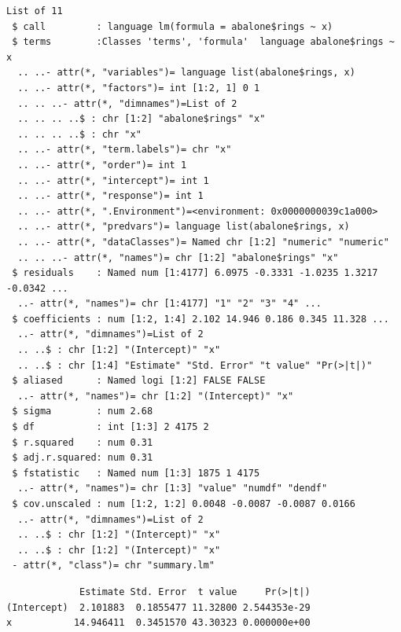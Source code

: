 \documentclass[
  11pt,
]{krantz}
\newenvironment{Shaded}{\begin{snugshade}}{\end{snugshade}}
\newcommand{\CommentTok}[1]{\textcolor[rgb]{0.37,0.37,0.37}{\textit{#1}}}
\newcommand{\ControlFlowTok}[1]{\textcolor[rgb]{0.27,0.27,0.27}{\textbf{#1}}}
\newcommand{\DecValTok}[1]{\textcolor[rgb]{0.06,0.06,0.06}{#1}}
\newcommand{\KeywordTok}[1]{\textcolor[rgb]{0.27,0.27,0.27}{\textbf{#1}}}
\newcommand{\NormalTok}[1]{#1}
\newcommand{\OperatorTok}[1]{\textcolor[rgb]{0.43,0.43,0.43}{\textbf{#1}}}
\newcommand{\StringTok}[1]{\textcolor[rgb]{0.5,0.5,0.5}{#1}}
\begin{document}
\begin{verbatim}
List of 11
 $ call         : language lm(formula = abalone$rings ~ x)
 $ terms        :Classes 'terms', 'formula'  language abalone$rings ~ x
  .. ..- attr(*, "variables")= language list(abalone$rings, x)
  .. ..- attr(*, "factors")= int [1:2, 1] 0 1
  .. .. ..- attr(*, "dimnames")=List of 2
  .. .. .. ..$ : chr [1:2] "abalone$rings" "x"
  .. .. .. ..$ : chr "x"
  .. ..- attr(*, "term.labels")= chr "x"
  .. ..- attr(*, "order")= int 1
  .. ..- attr(*, "intercept")= int 1
  .. ..- attr(*, "response")= int 1
  .. ..- attr(*, ".Environment")=<environment: 0x0000000039c1a000> 
  .. ..- attr(*, "predvars")= language list(abalone$rings, x)
  .. ..- attr(*, "dataClasses")= Named chr [1:2] "numeric" "numeric"
  .. .. ..- attr(*, "names")= chr [1:2] "abalone$rings" "x"
 $ residuals    : Named num [1:4177] 6.0975 -0.3331 -1.0235 1.3217 -0.0342 ...
  ..- attr(*, "names")= chr [1:4177] "1" "2" "3" "4" ...
 $ coefficients : num [1:2, 1:4] 2.102 14.946 0.186 0.345 11.328 ...
  ..- attr(*, "dimnames")=List of 2
  .. ..$ : chr [1:2] "(Intercept)" "x"
  .. ..$ : chr [1:4] "Estimate" "Std. Error" "t value" "Pr(>|t|)"
 $ aliased      : Named logi [1:2] FALSE FALSE
  ..- attr(*, "names")= chr [1:2] "(Intercept)" "x"
 $ sigma        : num 2.68
 $ df           : int [1:3] 2 4175 2
 $ r.squared    : num 0.31
 $ adj.r.squared: num 0.31
 $ fstatistic   : Named num [1:3] 1875 1 4175
  ..- attr(*, "names")= chr [1:3] "value" "numdf" "dendf"
 $ cov.unscaled : num [1:2, 1:2] 0.0048 -0.0087 -0.0087 0.0166
  ..- attr(*, "dimnames")=List of 2
  .. ..$ : chr [1:2] "(Intercept)" "x"
  .. ..$ : chr [1:2] "(Intercept)" "x"
 - attr(*, "class")= chr "summary.lm"
\end{verbatim}

\begin{Shaded}
\end{Shaded}

\begin{verbatim}
             Estimate Std. Error  t value     Pr(>|t|)
(Intercept)  2.101883  0.1855477 11.32800 2.544353e-29
x           14.946411  0.3451570 43.30323 0.000000e+00
\end{verbatim}

\begin{Shaded}
\end{Shaded}
\end{document}
